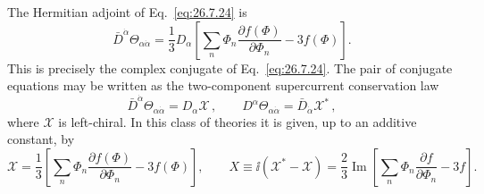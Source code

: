 The Hermitian adjoint of Eq.~\eqref{eq:26.7.24} is
\begin{equation}
  \bar D^{\dot\alpha}\Theta_{\alpha\dot\alpha}
  =\frac{1}{3}D_\alpha
    \left[
      \sum_n\Phi_n\frac{\partial f(\Phi)}{\partial\Phi_n}
      -3f(\Phi)
    \right].
  \tag{26.7.25}\label{eq:26.7.25}
\end{equation}
This is precisely the complex conjugate of Eq.~\eqref{eq:26.7.24}.
The pair of conjugate equations may be written as the two-component
supercurrent conservation law
\begin{equation}
  \bar D^{\dot\alpha}\Theta_{\alpha\dot\alpha}
  =D_\alpha\mathcal X\,,
  \qquad
  D^\alpha\Theta_{\alpha\dot\alpha}
  =\bar D_{\dot\alpha}\mathcal X^*\,,
  \tag{26.7.26}\label{eq:26.7.26}
\end{equation}
where \(\mathcal X\) is left-chiral. In this class of theories it is given,
up to an additive constant, by
\begin{equation}
  \mathcal X=\frac{1}{3}
  \left[
    \sum_n\Phi_n\frac{\partial f(\Phi)}{\partial\Phi_n}
    -3f(\Phi)
  \right],
  \qquad
  X\equiv \ii(\mathcal X^*-\mathcal X)
  =\frac{2}{3}\operatorname{Im}
  \left[
    \sum_n\Phi_n\frac{\partial f}{\partial\Phi_n}-3f
  \right].
  \tag{26.7.27}\label{eq:26.7.27}
\end{equation}

